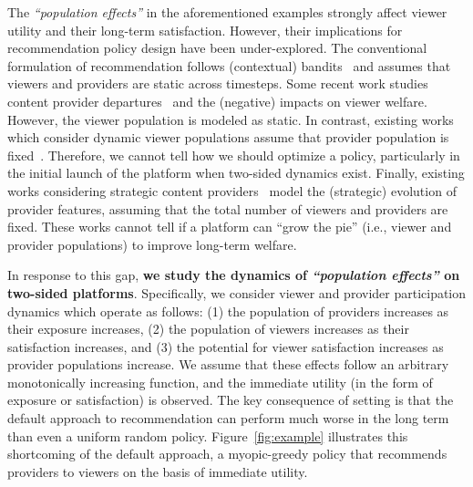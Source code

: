 The \textit{``population effects''} in the aforementioned examples strongly affect viewer utility and their long-term satisfaction.
However, their implications for recommendation policy design have been under-explored. 
The conventional formulation of recommendation follows (contextual) bandits~\citep{li2010contextual} and assumes that viewers and providers are static across timesteps. 
Some recent work studies content provider departures~\citep{mladenov2020optimizing, huttenlocher2023matching} and the (negative) impacts on viewer welfare.
However, the viewer population is modeled as static.
In contrast, existing works which consider dynamic viewer populations assume that provider population is fixed~\citep{hashimoto2018fairness, dean2022emergent}.
Therefore, we cannot tell how we should optimize a policy, particularly in the initial launch of the platform when two-sided dynamics exist. Finally, existing works considering strategic content providers~\citep{hron2022modeling, jagadeesan2022supply, yao2023rethinking, yao2024exploration, prasad2023content} model the (strategic) evolution of provider features, assuming that the total number of viewers and providers are fixed. These works cannot tell if a platform can ``grow the pie'' (i.e., viewer and provider populations) to improve long-term welfare.

In response to this gap, \textbf{we study the dynamics of \textit{``population effects''} on two-sided platforms}. Specifically, we consider viewer and provider participation dynamics which operate as follows: (1) the population of providers increases as their exposure increases, (2) the population of viewers increases as their satisfaction increases, and (3) the potential for viewer satisfaction increases as provider populations increase. 
We assume that these effects follow an arbitrary monotonically increasing function, and the immediate utility (in the form of exposure or satisfaction) is observed. 
The key consequence of setting is that the default approach to recommendation can perform much worse in the long term than even a uniform random policy.
Figure~\ref{fig:example} illustrates this shortcoming of the default approach, a myopic-greedy policy that recommends providers to viewers on the basis of immediate utility.

